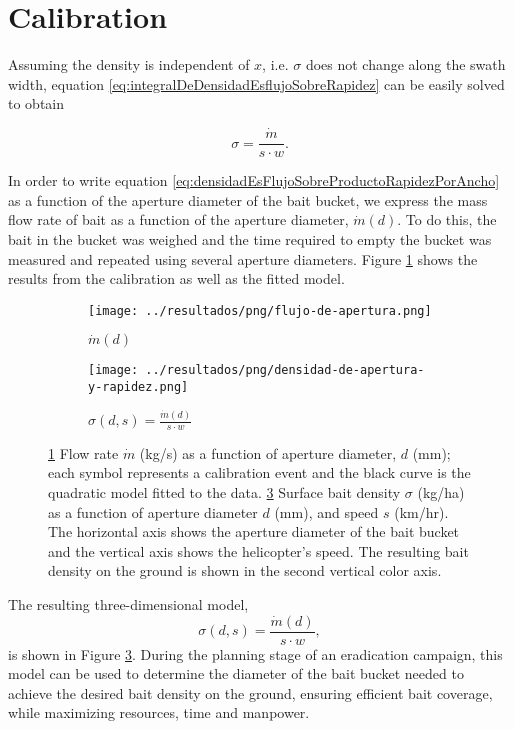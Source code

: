 \section{Calibration}
Assuming the density is independent of $x$, i.e. $\sigma$ does not change along the swath width, equation \eqref{eq:integralDeDensidadEsflujoSobreRapidez} can be easily solved to obtain

\begin{equation}
  \sigma = \frac{\dot{m}}{s\cdot w}.
  \label{eq:densidadEsFlujoSobreProductoRapidezPorAncho}
\end{equation}

In order to write equation \eqref{eq:densidadEsFlujoSobreProductoRapidezPorAncho} as a function of the aperture diameter of the bait bucket, we express the mass flow rate of bait as a function of the aperture diameter, $\dot{m}(d)$. To do this, the bait in the bucket was weighed and the time required to empty the bucket was measured and repeated using several aperture diameters. Figure \ref{fig:flujoDeApertura} shows the results from the calibration as well as the fitted model.

\begin{figure}
  \centering
  \begin{subfigure}[b]{0.45\textwidth}
    \texttt{[image: ../resultados/png/flujo-de-apertura.png]}
    \caption{$\dot{m}(d)$}
    \label{fig:flujoDeApertura}
  \end{subfigure}
  \begin{subfigure}[b]{0.45\textwidth}
    \texttt{[image: ../resultados/png/densidad-de-apertura-y-rapidez.png]}
    \caption{$\sigma(d,s)= \frac{\dot{m}(d)}{s\cdot w}$}
    \label{fig:densidadDeAperturaYRapidez}
  \end{subfigure}
  \caption{ \ref{fig:flujoDeApertura}
  Flow rate $\dot{m}$ (kg/s) as a function of aperture diameter, $d$
  (mm); each symbol represents a calibration event and the black curve is the
  quadratic model fitted to the data. \ref{fig:densidadDeAperturaYRapidez}
  Surface bait density $\sigma$ (kg/ha) as a function of aperture diameter $d$
  (mm), and speed $s$ (km/hr). The horizontal axis shows the aperture diameter of
  the bait bucket and the vertical axis shows the helicopter's speed. The
  resulting bait density on the ground is shown in the second vertical color axis.}
\end{figure}

The resulting three-dimensional model, $$\sigma(d,s)= \frac{\dot{m}(d)}{s\cdot w},$$ is shown in Figure \ref{fig:densidadDeAperturaYRapidez}. During the planning stage of an eradication campaign, this model can be used to determine the diameter of the bait bucket needed to achieve the desired bait density on the ground, ensuring efficient bait coverage, while maximizing resources, time and manpower.
